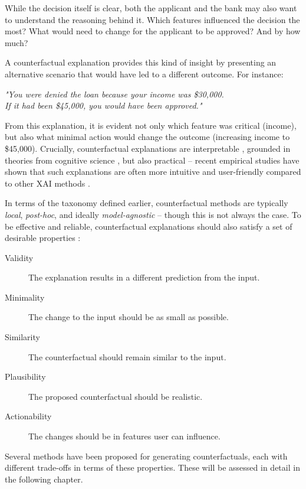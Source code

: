 While the decision itself is clear, both the applicant and the bank may also want to understand the reasoning behind it. Which features influenced the decision the most? What would need to change for the applicant to be approved? And by how much?

A counterfactual explanation provides this kind of insight by presenting an alternative scenario that would have led to a different outcome. For instance:

\begin{center}
    \textit{"You were denied the loan because your income was \$30,000.\\
        If it had been \$45,000, you would have been approved."}
\end{center}

From this explanation, it is evident not only which feature was critical (income),
but also what minimal action would change the outcome (increasing income to \$45,000).
Crucially, counterfactual explanations are interpretable \cite{pearl2009causal},
grounded in theories from cognitive science \cite{byrne2019counterfactuals},
but also practical -- recent empirical studies have shown that such explanations are often
more intuitive and user-friendly compared to other XAI methods \cite{warren2022features}.

In terms of the taxonomy defined earlier, counterfactual methods are typically \emph{local}, \emph{post-hoc}, and ideally \emph{model-agnostic} -- though this is not always the case.
To be effective and reliable, counterfactual explanations should also satisfy a set of desirable properties \cite{guidotti2018survey}:

\begin{description}
    \item[Validity] The explanation results in a different prediction from the input.
    \item[Minimality] The change to the input should be as small as possible.
    \item[Similarity] The counterfactual should remain similar to the input.
    \item[Plausibility] The proposed counterfactual should be realistic.
    \item[Actionability] The changes should be in features user can influence.
\end{description}

Several methods have been proposed for generating counterfactuals,
each with different trade-offs in terms of these properties.
These will be assessed in detail in the following chapter.

